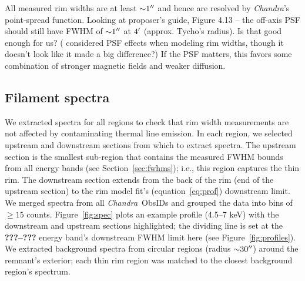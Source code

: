 \documentclass[iop, apj, numberedappendix, twocolappendix]{emulateapj}
\newcommand*{\mt}{\mathrm}
\newcommand*{\unit}[1]{\;\mt{#1}}  %
\newcommand*{\abt}{\mathord{\sim}} %
\newcommand*{\Chandra}{\textit{Chandra}\ }
\begin{document}
All measured rim widths are at least $\abt 1\arcsec$ and hence are resolved by
\textit{Chandra}'s point-spread function.
Looking at proposer's guide, Figure 4.13 -- the off-axis PSF should
still have FWHM of $\abt 1\arcsec$ at $4\mbox{$^\prime$}$ (approx. Tycho's radius).
Is that good enough for us?
(\citet{cassam-chenai2007} considered PSF effects when modeling rim widths,
though it doesn't look like it made a big difference?) If the PSF matters, this
favors some combination of stronger magnetic fields and weaker diffusion.

\subsection{Filament spectra}
\label{sec:spec}

We extracted spectra for all regions to check that rim width measurements are
not affected by contaminating thermal line emission.  In each region, we
selected upstream and downstream sections from which to extract spectra.  The
upstream section is the smallest sub-region that contains the measured FWHM
bounds from all energy bands (see Section~\ref{sec:fwhms}); i.e., this region
captures the thin rim.  The downstream section extends from the back of the rim
(end of the upstream section) to the rim model fit's (equation~\eqref{eq:prof})
downstream limit.  We merged spectra from all \Chandra ObsIDs and grouped the
data into bins of $\geq 15$ counts.  Figure~\ref{fig:spec} plots an example
profile (4.5--7 keV) with the downstream and upstream sections highlighted; the
dividing line is set at the \textbf{???--???} energy band's downstream FWHM
limit here (see Figure~\ref{fig:profiles}).
We extracted background spectra from circular regions (radius $\abt 30\arcsec$)
around the remnant's exterior; each thin rim region was matched to the closest
background region's spectrum.

\begin{figure*}
    \caption{Spectra and fits from Region 1. Left: $4.5$--$7 \unit{keV}$
    profile with highlighted downstream (blue) and upstream (grey) sections.
    Intensity units are arbitrary (a.u.).  Middle: downstream spectrum with
    absorbed power law fit; Si and S lines at $1.85$, $2.45 \unit{keV}$ are
    clearly visible.  Right: upstream spectrum with absorbed power law fit
    shows that the filament is likely free of thermal line emission.}
    \label{fig:spec}
\end{figure*}
\end{document}
